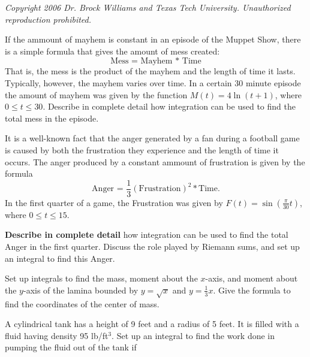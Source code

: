\documentclass{exam}[12pt]
\begin{document}
\pagestyle{head}

\small{\textit{
Copyright 2006 Dr. Brock Williams and
Texas Tech University.  Unauthorized reproduction prohibited.
}}

\begin{questions}
\large{


\question If the ammount of mayhem is constant in an episode of the
Muppet Show, there is a simple formula that gives the amount of mess created:
\[
\text{Mess = Mayhem * Time}
\]
That is, the mess is the product of the mayhem and the length of time it lasts.
Typically, however, the mayhem varies over time.  
In a certain 30 minute episode the amount of mayhem was given by the function 
$M(t) = 4 \ln(t+1)$, where $0\leq t\leq 30$.
Describe in complete detail how integration can be used to 
find the total mess in the episode.
\vspace{.5in}

\question  It is a well-known fact that the anger generated by a fan
during a football game is caused by both the frustration they experience
and the length of time it occurs.  The anger produced by a 
 constant ammount of frustration is given by the formula
\[
\text{Anger = }\frac{1}{3} \left(\text {Frustration}\right)^2 * \text{Time}.
\]
In the first quarter of a game, the Frustration was given by
$\displaystyle F(t)= \sin\left(\frac{\pi}{30} t\right)  $, where $0\leq t\leq 15$.
\vspace{.2in}

\textbf{Describe in complete detail} how integration can be used to find
the total Anger in the first quarter.  Discuss the role played by Riemann 
sums, and set up an integral to find this Anger.

\vspace{.7in}

\question Set up integrals to find the mass, moment about the $x$-axis, and
moment about the $y$-axis of the lamina bounded by $y=\sqrt{x}$ and
$y=\displaystyle \frac{1}{3} x$.  
Give the formula to find the coordinates of the center of mass.
\vspace{.5in}

\question A cylindrical tank has a height of 9 feet and a radius of 5 feet.
It is filled with a fluid having density 95 lb/ft$^3$.
Set up an integral to find the work done in pumping the fluid out of the tank if
\begin{parts}

\end{parts}}
\end{questions}
\end{document}
